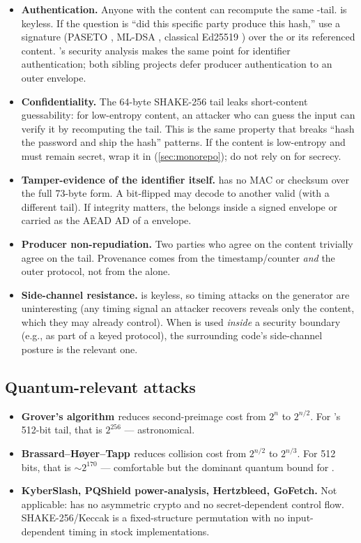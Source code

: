 \begin{itemize}
  \item \textbf{Authentication.} Anyone with the content can recompute the same \pqhash{}-tail. \pqhash{} is keyless. If the question is ``did this specific party produce this hash,'' use a signature (PASETO \citep{paseto-v4}, ML-DSA \citep{fips204}, classical Ed25519 \citep{rfc8032}) over the \pqhash{} or its referenced content. \pqid{}'s security analysis makes the same point for identifier authentication; both sibling projects defer producer authentication to an outer envelope.
  \item \textbf{Confidentiality.} The 64-byte SHAKE-256 tail leaks short-content guessability: for low-entropy content, an attacker who can guess the input can verify it by recomputing the tail. This is the same property that breaks ``hash the password and ship the hash'' patterns. If the content is low-entropy and must remain secret, wrap it in \pqcrypt{} (\cref{sec:monorepo}); do not rely on \pqhash{} for secrecy.
  \item \textbf{Tamper-evidence of the identifier itself.} \pqhash{} has no MAC or checksum over the full 73-byte form. A bit-flipped \pqhash{} may decode to another valid \pqhash{} (with a different tail). If integrity matters, the \pqhash{} belongs inside a signed envelope or carried as the AEAD AD of a \pqcrypt{} envelope.
  \item \textbf{Producer non-repudiation.} Two parties who agree on the content trivially agree on the tail. Provenance comes from the timestamp/counter \emph{and} the outer protocol, not from the \pqhash{} alone.
  \item \textbf{Side-channel resistance.} \pqhash{} is keyless, so timing attacks on the generator are uninteresting (any timing signal an attacker recovers reveals only the content, which they may already control). When \pqhash{} is used \emph{inside} a security boundary (e.g., as part of a keyed protocol), the surrounding code's side-channel posture is the relevant one.
\end{itemize}

\subsection{Quantum-relevant attacks}

\begin{itemize}
  \item \textbf{Grover's algorithm \citep{grover1996}} reduces second-preimage cost from $2^n$ to $2^{n/2}$. For \pqhash{}'s 512-bit tail, that is $2^{256}$ --- astronomical.
  \item \textbf{Brassard--H{\o}yer--Tapp \citep{bht1998}} reduces collision cost from $2^{n/2}$ to $2^{n/3}$. For 512 bits, that is $\sim 2^{170}$ --- comfortable but the dominant quantum bound for \pqhash{}.
  \item \textbf{KyberSlash, PQShield power-analysis, Hertzbleed, GoFetch.} Not applicable: \pqhash{} has no asymmetric crypto and no secret-dependent control flow. SHAKE-256/Keccak is a fixed-structure permutation \citep{fips202} with no input-dependent timing in stock implementations.
\end{itemize}

